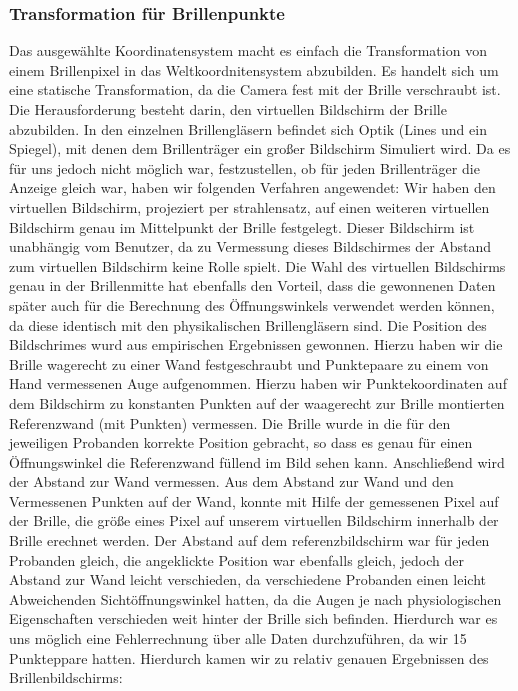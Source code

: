 {\subsubsection{Transformation für Brillenpunkte}
Das ausgewählte Koordinatensystem macht es einfach die Transformation von einem Brillenpixel in das Weltkoordnitensystem abzubilden. Es handelt sich um eine statische Transformation, da die Camera fest mit der Brille verschraubt ist. Die Herausforderung besteht darin, den virtuellen Bildschirm der Brille abzubilden. In den einzelnen Brillengläsern befindet sich Optik (Lines und ein Spiegel), mit denen dem Brillenträger ein großer Bildschirm Simuliert wird. Da es für uns jedoch nicht möglich war, festzustellen, ob für jeden Brillenträger die Anzeige gleich war, haben wir folgenden Verfahren angewendet: Wir haben den virtuellen Bildschirm, projeziert per strahlensatz, auf einen weiteren virtuellen Bildschirm genau im Mittelpunkt der Brille festgelegt. Dieser Bildschirm ist unabhängig vom Benutzer, da zu Vermessung dieses Bildschirmes der Abstand zum virtuellen Bildschirm keine Rolle spielt.
Die Wahl des virtuellen Bildschirms genau in der Brillenmitte hat ebenfalls den Vorteil, dass die gewonnenen Daten später auch für die Berechnung des Öffnungswinkels verwendet werden können, da diese identisch mit den physikalischen Brillengläsern sind.
Die Position des Bildschrimes wurd aus empirischen Ergebnissen gewonnen. Hierzu haben wir die Brille wagerecht zu einer Wand festgeschraubt und Punktepaare zu einem von Hand vermessenen Auge aufgenommen. Hierzu haben wir Punktekoordinaten auf dem Bildschirm zu konstanten Punkten auf der waagerecht zur Brille montierten Referenzwand (mit Punkten) vermessen. Die Brille wurde in die für den jeweiligen Probanden korrekte Position gebracht, so dass es genau für einen Öffnungswinkel die Referenzwand füllend im Bild sehen kann. Anschließend wird der Abstand zur Wand vermessen. Aus dem Abstand zur Wand und den Vermessenen Punkten auf der Wand, konnte mit Hilfe der gemessenen Pixel auf der Brille, die größe eines Pixel auf unserem virtuellen Bildschirm innerhalb der Brille erechnet werden. Der Abstand auf dem referenzbildschirm war für jeden Probanden gleich, die angeklickte Position war ebenfalls gleich, jedoch der Abstand zur Wand leicht verschieden, da verschiedene Probanden einen leicht Abweichenden Sichtöffnungswinkel hatten, da die Augen je nach physiologischen Eigenschaften verschieden weit hinter der Brille sich befinden. Hierdurch war es uns möglich eine Fehlerrechnung über alle Daten durchzuführen, da wir 15 Punkteppare hatten. Hierdurch kamen wir zu relativ genauen Ergebnissen des Brillenbildschirms:
    
}

